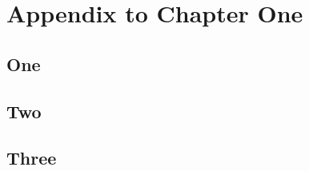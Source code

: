 \chapter{Appendix to Chapter One}
\label{appendix1}

\section{One}
\lipsum[1]

\lipsum[11]

\section{Two}
\lipsum[2]

\section{Three}
\lipsum[2]